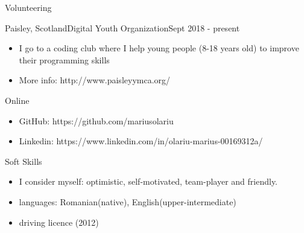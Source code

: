\documentclass[]{mcdowellcv}
\begin{document}
	\begin{cvsection}{Volunteering}
		\begin{cvsubsection}{Paisley, Scotland}{Digital Youth Organization}{Sept 2018 - present}
			\begin{itemize}
				\item I go to a coding club where I help young people (8-18 years old) to improve their programming skills
				\item More info: http://www.paisleyymca.org/
			\end{itemize}
		\end{cvsubsection}
	\end{cvsection}

	\begin{cvsection}{Online}
		\begin{cvsubsection}{}{}{}
			\begin{itemize}
				\item GitHub: https://github.com/mariusolariu
				\item Linkedin: https://www.linkedin.com/in/olariu-marius-00169312a/
			\end{itemize}
		\end{cvsubsection}
	\end{cvsection}

	\begin{cvsection}{Soft Skills}
		\begin{cvsubsection}{}{}{}
			\begin{itemize}
				\item I consider myself: optimistic, self-motivated, team-player and friendly.
				\item languages: Romanian(native), English(upper-intermediate)
				\item driving licence (2012)
			\end{itemize}
		\end{cvsubsection}
	\end{cvsection}
	
\end{document}
